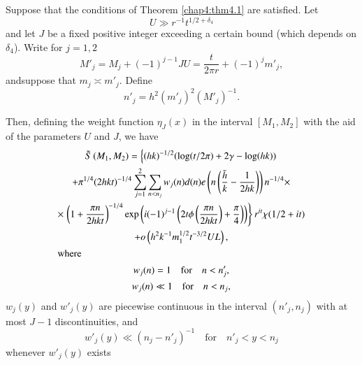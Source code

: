 \begin{thm}\label{chap4:thm4.3}
Suppose that the conditions of Theorem \ref{chap4:thm4.1} are
satisfied. Let 
\begin{equation}\label{chap4:eq4.1.29}
U\gg r^{-1}t^{1/2+\delta_4}
\end{equation}
and let $J$ be a fixed positive integer exceeding a certain bound
(which depends on $\delta_4$). Write for $j=1,2$
$$
M'_j=M_j+(-1)^{j-1}JU=\frac{t}{2\pi r}+(-1)^jm'_j,
$$
and\pageoriginale suppose that $m_j\asymp m'_j$. Define
\begin{equation}\label{chap4:eq4.1.30}
n'_j=h^2(m'_j)^2\left(M'_j\right)^{-1}.
\end{equation}

Then, defining the weight function $\eta_J(x)$ in the interval $[M_1,M_2]$ with the aid of the parameters $U$ and  $J$, we have 
\begin{gather}
\tilde{S}\left(M_1,M_2\right)=\left\{(hk)^{-1/2}(\log(t/2\pi)+2\gamma -\log (hk))\right.\label{chap4:eq4.1.31}\\
+\pi^{1/4}(2hkt)^{-1/4}\sum\limits_{j=1}^2 \sum\limits_{n<n_j}w_j(n)d(n)e \left(n\left(\frac{\bar{h}}{k}-\frac{1}{2hk}\right)\right)n^{-1/4} \times\notag\\
\times \left.\left(1+\frac{\pi n}{2hkt}\right)^{-1/4}\exp\left(i(-1)^{j-1} \left(2t\phi\left(\frac{\pi n}{2hkt}\right)+\frac{\pi}{4}\right)\right) \right\}r^{it}\chi(1/2+it)\notag\\
+o\left(h^2k^{-1}m_1^{1/2}t^{-3/2}UL\right),\notag\\
\intertext{where}
w_j(n)=1\quad\text{for}\quad n<n'_j,\label{chap4:eq4.1.32}\\
w_j(n)\ll 1\quad\text{for}\quad n<n_j,\label{chap4:eq4.1.33}
\end{gather}
$w_j(y)$ and $w'_j(y)$ are piecewise continuous in the interval $(n'_j,n_j)$ with at most $J-1$ discontinuities, and 
\begin{equation}\label{chap4:eq4.1.34}
w'_j(y)\ll \left(n_j-n'_j\right)^{-1}\quad\text{for}\quad n'_j<y<n_j
\end{equation}
whenever $w'_j(y)$ exists
\end{thm}

